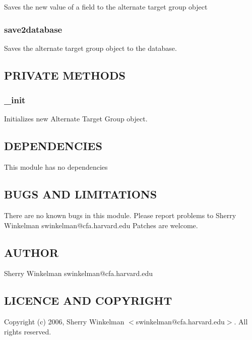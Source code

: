\documentclass{article}
\begin{document}
Saves the new value of a field to the alternate target group object

\subsubsection*{save2database\label{AltGrp_save2database}}


Saves the alternate target group object to the database.

\subsection*{PRIVATE METHODS\label{AltGrp_PRIVATE_METHODS}}
\subsubsection*{\_init\label{AltGrp__init}}


Initializes new Alternate Target Group object.

\subsection*{DEPENDENCIES\label{AltGrp_DEPENDENCIES}}


This module has no dependencies

\subsection*{BUGS AND LIMITATIONS\label{AltGrp_BUGS_AND_LIMITATIONS}}


There are no known bugs in this module.
Please report problems to Sherry Winkelman swinkelman@cfa.harvard.edu
Patches are welcome.

\subsection*{AUTHOR\label{AltGrp_AUTHOR}}


Sherry Winkelman swinkelman@cfa.harvard.edu

\subsection*{LICENCE AND COPYRIGHT\label{AltGrp_LICENCE_AND_COPYRIGHT}}


Copyright (c) 2006, Sherry Winkelman $<$swinkelman@cfa.harvard.edu$>$. All rights 
reserved.
\end{document}
